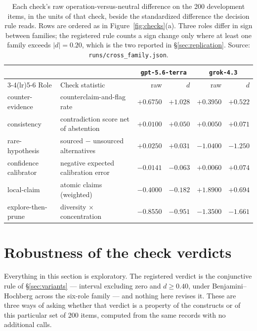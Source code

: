 \begin{table}[h]
\centering
\small
\begin{tabular}{llrrrr}
\toprule
 & & \multicolumn{2}{c}{\texttt{gpt-5.6-terra}} & \multicolumn{2}{c}{\texttt{grok-4.3}} \\
\cmidrule(lr){3-4}\cmidrule(lr){5-6}
Role & Check statistic & raw & $d$ & raw & $d$ \\
\midrule
counter-evidence      & counterclaim-and-flag rate           & $+0.6750$ & $+1.028$ & $+0.3950$ & $+0.522$ \\
consistency           & contradiction score net of abstention & $+0.0100$ & $+0.050$ & $+0.0050$ & $+0.071$ \\
rare-hypothesis       & sourced $-$ unsourced alternatives    & $+0.0250$ & $+0.031$ & $-1.0400$ & $-1.250$ \\
confidence calibrator & negative expected calibration error   & $-0.0141$ & $-0.063$ & $+0.0060$ & $+0.074$ \\
local-claim           & atomic claims (weighted)              & $-0.4000$ & $-0.182$ & $+1.8900$ & $+0.694$ \\
explore-then-prune    & diversity $\times$ concentration      & $-0.8550$ & $-0.951$ & $-1.3500$ & $-1.661$ \\
\bottomrule
\end{tabular}
\caption{Each check's raw operation-versus-neutral difference on the 200 development items, in the
units of that check, beside the standardized difference the decision rule reads. Rows are ordered as
in Figure~\ref{fig:checks}(a). Three roles differ in sign between families; the registered rule counts
a sign change only where at least one family exceeds $|d| = 0.20$, which is the two reported in
\S\ref{sec:replication}. Source: \texttt{runs/cross\_family.json}.}
\label{tab:raw-diffs}
\end{table}

\section{Robustness of the check verdicts}
\label{app:robustness}

Everything in this section is exploratory. The registered verdict is the conjunctive rule of
\S\ref{sec:variants} --- interval excluding zero and $d \ge 0.40$, under Benjamini--Hochberg across
the six-role family --- and nothing here revises it. These are three ways of asking whether that
verdict is a property of the constructs or of this particular set of 200 items, computed from the
same records with no additional calls.

